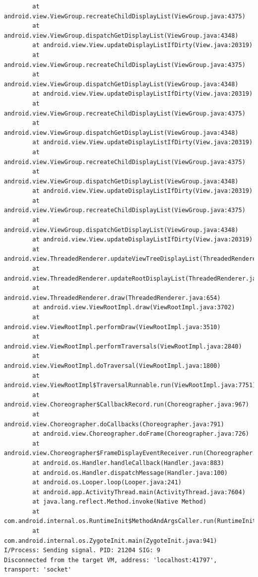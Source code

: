 \documentclass[a4paper,12pt]{book}
\begin{document}
\begin{lstlisting}
        at android.view.ViewGroup.recreateChildDisplayList(ViewGroup.java:4375)
        at android.view.ViewGroup.dispatchGetDisplayList(ViewGroup.java:4348)
        at android.view.View.updateDisplayListIfDirty(View.java:20319)
        at android.view.ViewGroup.recreateChildDisplayList(ViewGroup.java:4375)
        at android.view.ViewGroup.dispatchGetDisplayList(ViewGroup.java:4348)
        at android.view.View.updateDisplayListIfDirty(View.java:20319)
        at android.view.ViewGroup.recreateChildDisplayList(ViewGroup.java:4375)
        at android.view.ViewGroup.dispatchGetDisplayList(ViewGroup.java:4348)
        at android.view.View.updateDisplayListIfDirty(View.java:20319)
        at android.view.ViewGroup.recreateChildDisplayList(ViewGroup.java:4375)
        at android.view.ViewGroup.dispatchGetDisplayList(ViewGroup.java:4348)
        at android.view.View.updateDisplayListIfDirty(View.java:20319)
        at android.view.ViewGroup.recreateChildDisplayList(ViewGroup.java:4375)
        at android.view.ViewGroup.dispatchGetDisplayList(ViewGroup.java:4348)
        at android.view.View.updateDisplayListIfDirty(View.java:20319)
        at android.view.ThreadedRenderer.updateViewTreeDisplayList(ThreadedRenderer.java:575)
        at android.view.ThreadedRenderer.updateRootDisplayList(ThreadedRenderer.java:581)
        at android.view.ThreadedRenderer.draw(ThreadedRenderer.java:654)
        at android.view.ViewRootImpl.draw(ViewRootImpl.java:3702)
        at android.view.ViewRootImpl.performDraw(ViewRootImpl.java:3510)
        at android.view.ViewRootImpl.performTraversals(ViewRootImpl.java:2840)
        at android.view.ViewRootImpl.doTraversal(ViewRootImpl.java:1800)
        at android.view.ViewRootImpl$TraversalRunnable.run(ViewRootImpl.java:7751)
        at android.view.Choreographer$CallbackRecord.run(Choreographer.java:967)
        at android.view.Choreographer.doCallbacks(Choreographer.java:791)
        at android.view.Choreographer.doFrame(Choreographer.java:726)
        at android.view.Choreographer$FrameDisplayEventReceiver.run(Choreographer.java:952)
        at android.os.Handler.handleCallback(Handler.java:883)
        at android.os.Handler.dispatchMessage(Handler.java:100)
        at android.os.Looper.loop(Looper.java:241)
        at android.app.ActivityThread.main(ActivityThread.java:7604)
        at java.lang.reflect.Method.invoke(Native Method)
        at com.android.internal.os.RuntimeInit$MethodAndArgsCaller.run(RuntimeInit.java:492)
        at com.android.internal.os.ZygoteInit.main(ZygoteInit.java:941)
I/Process: Sending signal. PID: 21204 SIG: 9
Disconnected from the target VM, address: 'localhost:41797', transport: 'socket'
\end{lstlisting} 
\end{document}
